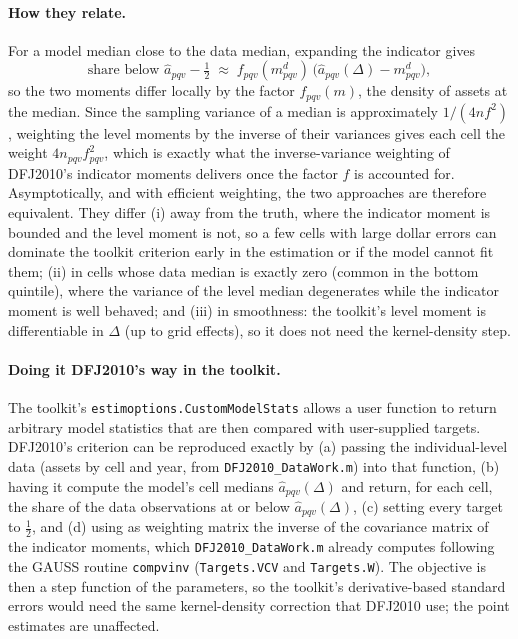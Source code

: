\documentclass[11pt,fleqn]{article}
\begin{document}
\paragraph{How they relate.}
For a model median close to the data median, expanding the indicator gives
\begin{equation*}
 \text{share below } \hat{a}_{pqv} - \tfrac{1}{2} \;\approx\; f_{pqv}(m^d_{pqv})\,\big(\hat{a}_{pqv}(\Delta) - m^d_{pqv}\big) ,
\end{equation*}
so the two moments differ locally by the factor $f_{pqv}(m)$, the density of assets at the median. Since the sampling variance of a median is approximately $1/(4 n f^2)$, weighting the level moments by the inverse of their variances gives each cell the weight $4 n_{pqv} f_{pqv}^2$, which is exactly what the inverse-variance weighting of DFJ2010's indicator moments delivers once the factor $f$ is accounted for. Asymptotically, and with efficient weighting, the two approaches are therefore equivalent. They differ (i) away from the truth, where the indicator moment is bounded and the level moment is not, so a few cells with large dollar errors can dominate the toolkit criterion early in the estimation or if the model cannot fit them; (ii) in cells whose data median is exactly zero (common in the bottom quintile), where the variance of the level median degenerates while the indicator moment is well behaved; and (iii) in smoothness: the toolkit's level moment is differentiable in $\Delta$ (up to grid effects), so it does not need the kernel-density step.

\paragraph{Doing it DFJ2010's way in the toolkit.}
The toolkit's \texttt{estimoptions.CustomModelStats} allows a user function to return arbitrary model statistics that are then compared with user-supplied targets. DFJ2010's criterion can be reproduced exactly by (a) passing the individual-level data (assets by cell and year, from \texttt{DFJ2010\_DataWork.m}) into that function, (b) having it compute the model's cell medians $\hat{a}_{pqv}(\Delta)$ and return, for each cell, the share of the data observations at or below $\hat{a}_{pqv}(\Delta)$, (c) setting every target to $\tfrac{1}{2}$, and (d) using as weighting matrix the inverse of the covariance matrix of the indicator moments, which \texttt{DFJ2010\_DataWork.m} already computes following the GAUSS routine \texttt{compvinv} (\texttt{Targets.VCV} and \texttt{Targets.W}). The objective is then a step function of the parameters, so the toolkit's derivative-based standard errors would need the same kernel-density correction that DFJ2010 use; the point estimates are unaffected.
\end{document}
